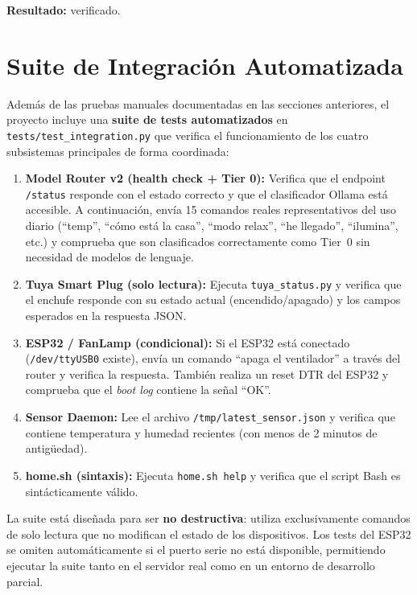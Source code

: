 \textbf{Resultado:} verificado.

\section{Suite de Integración Automatizada}
\label{sec:suite_integracion}

Además de las pruebas manuales documentadas en las secciones anteriores, el proyecto incluye una \textbf{suite de tests automatizados} en \texttt{tests/test\_integration.py} que verifica el funcionamiento de los cuatro subsistemas principales de forma coordinada:

\begin{enumerate}
    \item \textbf{Model Router v2 (health check + Tier 0):} Verifica que el endpoint \texttt{/status} responde con el estado correcto y que el clasificador Ollama está accesible. A continuación, envía 15 comandos reales representativos del uso diario (``temp'', ``cómo está la casa'', ``modo relax'', ``he llegado'', ``ilumina'', etc.) y comprueba que son clasificados correctamente como Tier~0 sin necesidad de modelos de lenguaje.
    \item \textbf{Tuya Smart Plug (solo lectura):} Ejecuta \texttt{tuya\_status.py} y verifica que el enchufe responde con su estado actual (encendido/apagado) y los campos esperados en la respuesta JSON.
    \item \textbf{ESP32 / FanLamp (condicional):} Si el ESP32 está conectado (\texttt{/dev/ttyUSB0} existe), envía un comando ``apaga el ventilador'' a través del router y verifica la respuesta. También realiza un reset DTR del ESP32 y comprueba que el \textit{boot log} contiene la señal ``OK''.
    \item \textbf{Sensor Daemon:} Lee el archivo \texttt{/tmp/latest\_sensor.json} y verifica que contiene temperatura y humedad recientes (con menos de 2 minutos de antigüedad).
    \item \textbf{home.sh (sintaxis):} Ejecuta \texttt{home.sh help} y verifica que el script Bash es sintácticamente válido.
\end{enumerate}

La suite está diseñada para ser \textbf{no destructiva}: utiliza exclusivamente comandos de solo lectura que no modifican el estado de los dispositivos. Los tests del ESP32 se omiten automáticamente si el puerto serie no está disponible, permitiendo ejecutar la suite tanto en el servidor real como en un entorno de desarrollo parcial.

